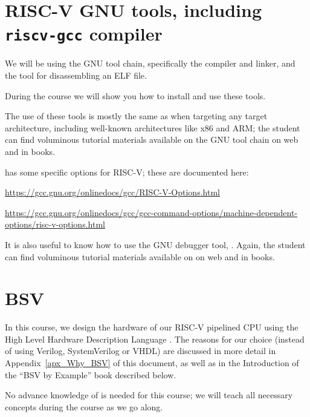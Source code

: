 
\section{RISC-V GNU tools, including {\tt riscv-gcc} compiler}

\label{apx_resources_gnu_tools}

We will be using the GNU tool chain, specifically the {\gcc} compiler
and linker, and the {\objdump} tool for disassembling an ELF file.

During the course we will show you how to install and use these tools.

The use of these tools is mostly the same as when targeting any target
architecture, including well-known architectures like x86 and ARM; the
student can find voluminous tutorial materials available on the GNU
tool chain on web and in books.

{\gcc} has some specific options for RISC-V; these are documented here:

\begin{tightlist}
  \item
  \url{https://gcc.gnu.org/onlinedocs/gcc/RISC-V-Options.html}

  \item
  \url{https://gcc.gnu.org/onlinedocs/gcc/gcc-command-options/machine-dependent-options/risc-v-options.html}
\end{tightlist}

It is also useful to know how to use the GNU debugger tool, {\gdb}.
Again, the student can find voluminous tutorial materials available on
on web and in books.


\section{BSV}

In this course, we design the hardware of our RISC-V pipelined CPU
using the High Level Hardware Description Language {\BSV}.  The
reasons for our choice (instead of using Verilog, SystemVerilog or
VHDL) are discussed in more detail in Appendix~\ref{apx_Why_BSV} of
this document, as well as in the Introduction of the ``BSV by
Example'' book described below.

No advance knowledge of {\BSV} is needed for this course; we will
teach all necessary {\BSV} concepts during the course as we go along.

